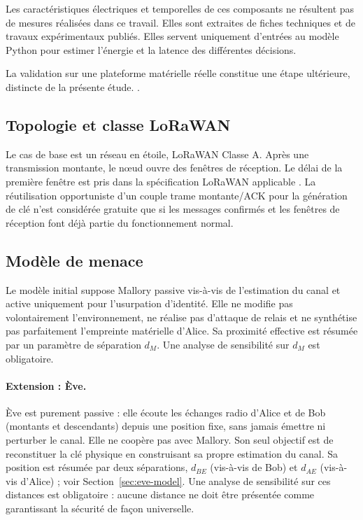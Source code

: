 \documentclass[conference,a4paper]{IEEEtran}
\begin{document}
Les caractéristiques électriques et temporelles de ces composants
ne résultent pas de mesures réalisées dans ce travail. Elles sont
extraites de fiches techniques et de travaux expérimentaux publiés.
Elles servent uniquement d'entrées au modèle Python pour estimer
l'énergie et la latence des différentes décisions.

La validation sur une plateforme matérielle réelle constitue une
étape ultérieure, distincte de la présente étude. \cite{sx1276ds,stml1ds}.

\subsection{Topologie et classe LoRaWAN}
Le cas de base est un réseau en étoile, LoRaWAN Classe A. Après une transmission montante, le nœud ouvre des fenêtres de réception. Le délai de la première fenêtre est pris dans la spécification LoRaWAN applicable \cite{lorawan104}. La réutilisation opportuniste d'un couple trame montante/ACK pour la génération de clé n'est considérée gratuite que si les messages confirmés et les fenêtres de réception font déjà partie du fonctionnement normal.

\subsection{Modèle de menace}
\label{sec:threat-model-eve}
Le modèle initial suppose Mallory passive vis-à-vis de l'estimation du canal et active uniquement pour l'usurpation d'identité. Elle ne modifie pas volontairement l'environnement, ne réalise pas d'attaque de relais et ne synthétise pas parfaitement l'empreinte matérielle d'Alice. Sa proximité effective est résumée par un paramètre de séparation $d_M$. Une analyse de sensibilité sur $d_M$ est obligatoire.

\paragraph{Extension : Ève.} Ève est purement passive : elle écoute les échanges radio d'Alice et de Bob (montants et descendants) depuis une position fixe, sans jamais émettre ni perturber le canal. Elle ne coopère pas avec Mallory. Son seul objectif est de reconstituer la clé physique en construisant sa propre estimation du canal. Sa position est résumée par deux séparations, $d_{BE}$ (vis-à-vis de Bob) et $d_{AE}$ (vis-à-vis d'Alice) ; voir Section~\ref{sec:eve-model}. Une analyse de sensibilité sur ces distances est obligatoire : aucune distance ne doit être présentée comme garantissant la sécurité de façon universelle.
\end{document}
